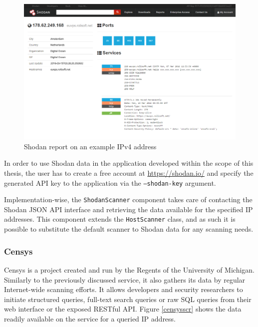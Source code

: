 \documentclass[a4paper,12pt]{article}
\begin{document}
	\begin{figure}[!htbp]
		\centering
		\includegraphics[scale=0.355]{shodan.png}
		\caption{Shodan report on an example IPv4 address}
		\label{shodanscr}
	\end{figure}
	
	In order to use Shodan data in the application developed within the scope of this thesis, the user has to create a free account at \url{https://shodan.io/} and specify the generated API key to the application via the \texttt{--shodan-key} argument.
	
	Implementation-wise, the \texttt{ShodanScanner} component takes care of contacting the Shodan JSON API interface and retrieving the data available for the specified IP addresses. This component extends the \texttt{HostScanner} class, and as such it is possible to substitute the default scanner to Shodan data for any scanning needs.

\subsubsection{Censys} \label{censys}
 

	Censys\cite{censys15} is a project created and run by the Regents of the University of Michigan. Similarly to the previously discussed service, it also gathers its data by regular Internet-wide scanning efforts. It allows developers and security researchers to initiate structured queries, full-text search queries or raw SQL queries from their web interface or the exposed RESTful API. Figure \ref{censysscr} shows the data readily available on the service for a queried IP address.
	
\end{document}
